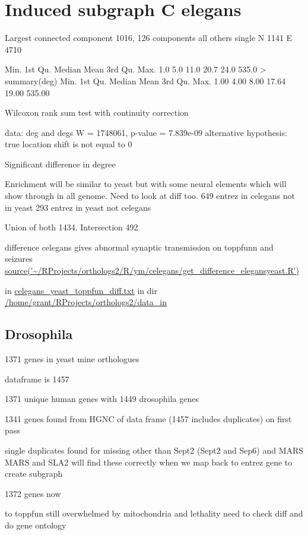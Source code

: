\section{Induced subgraph C elegans}

Largest connected component 1016, 126 components all others single N 1141 E 4710 

Min. 1st Qu.  Median    Mean 3rd Qu.    Max. 
    1.0     5.0    11.0    20.7    24.0   535.0 
> summary(deg)
   Min. 1st Qu.  Median    Mean 3rd Qu.    Max. 
   1.00    4.00    8.00   17.64   19.00  535.00 
   
	Wilcoxon rank sum test with continuity correction

data:  deg and degs
W = 1748061, p-value = 7.839e-09
alternative hypothesis: true location shift is not equal to 0

Significant difference in degree


Enrichment will be similar to yeast but with some neural elements which will show through in all genome. Need to look at diff too. 
649 entrez in celegans not in yeast
293 entrez in yeast not celegans

Union of both 1434. Intersection    492 

difference celegans gives abnormal synaptic transmission on toppfunn and seizures \url{source('~/RProjects/orthologs2/R/ym/celegans/get_difference_elegansyeast.R')}

in \url{celegans_yeast_toppfun_diff.txt} in dir \url{/home/grant/RProjects/orthologs2/data_in}


\subsection{Drosophila}

1371 genes in yeast mine orthologues

dataframe is 1457

1371 unique human genes with 1449 drosophila genes

1341 genes found from HGNC of data frame (1457 includes duplicates) on first pass

single duplicates found for missing other than Sept2 (Sept2 and Sep6) and MARS MARS and SLA2 will find these correctly when we map back to entrez gene to create subgraph

1372 genes now

to toppfun still overwhelmed by mitochondria and lethality need to check diff and do gene ontology

